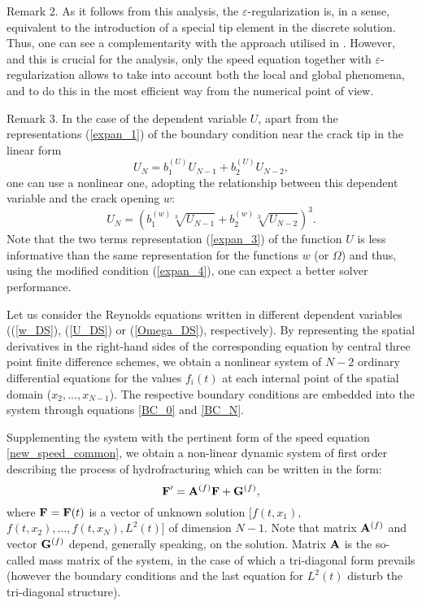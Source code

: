 {\sc Remark 2}. As it follows from this analysis, the
$\varepsilon$-regularization is, in a sense, equivalent to the
introduction of a special tip element in the discrete solution.
Thus, one can see a complementarity with the approach utilised in
\citet{Kovalyshen_1}. However, and this is crucial for the analysis,
only the speed equation together with $\varepsilon$-regularization
allows to take into account both the local and global phenomena, and
to do this in the most efficient way from the numerical point of
view.

{\sc Remark 3}. In the case of the dependent variable $U$, apart from the representations (\ref{expan_1}) of the boundary condition near the crack tip in the linear form
\begin{equation}\label{expan_3}
U_N=b_1^{(U)}U_{N-1}+b_2^{(U)}U_{N-2},
\end{equation}
one can use a nonlinear one, adopting the relationship between this dependent variable and the crack opening $w$:
\begin{equation}\label{expan_4}
U_N=\left(b_1^{(w)}\sqrt[3]{U_{N-1}}+b_2^{(w)}\sqrt[3]{U_{N-2}}\right)^3.
\end{equation}
Note that the two terms representation (\ref{expan_3}) of the function $U$ is less informative than
the same representation for the functions $w$ (or $\Omega$) and thus,
using the modified condition (\ref{expan_4}), one can expect a better solver performance.

Let us consider the Reynolds equations written in different dependent
variables ((\ref{w_DS}), (\ref{U_DS}) or (\ref{Omega_DS}),
respectively). By representing the
spatial derivatives in the right-hand sides of the corresponding
equation by central three point finite difference schemes, we
obtain a nonlinear system of $N-2$ ordinary differential equations
for the values $f_i(t)$ at each internal point of the spatial domain
($x_2,...,x_{N-1}$). The respective boundary conditions are embedded
into the system  through equations \eqref{BC_0} and
\eqref{BC_N}.

Supplementing the system with the pertinent form of the speed
equation \eqref{new_speed_common}, we obtain a non-linear dynamic
system of first order describing the process of hydrofracturing which
can be written in the form:
\begin{equation}\label{governing_dis}
{\bf F}' ={\bf A}^{(f)}{\bf F}+{\bf G}^{(f)},
\end{equation}
where ${\bf F}={\bf F}(t)$ is  a vector of unknown solution
$[f(t,x_1),$ $f(t,x_2),\ldots,f(t,x_N),L^2(t)]$ of dimension $N-1$.
Note that matrix ${\bf A}^{(f)}$ and vector ${\bf G}^{(f)}$ depend,
generally speaking, on the solution. Matrix $\bf A$ is the so-called
mass matrix of the system, in the case of which a tri-diagonal form
prevails (however the boundary conditions and the last equation for
$L^2(t)$ disturb the tri-diagonal structure).


